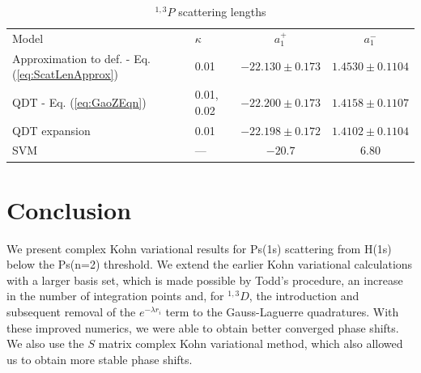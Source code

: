 \documentclass[preprint,showpacs,showkeys,preprintnumbers,amsmath,amssymb,longbibliography,pra,aps]{revtex4-1}
\begin{document}
\begin{table}[H]
\begin{center}
\begin{ruledtabular}
\begin{tabular}{l l c c}
Model & $\kappa$ & $a_1^+$ & $a_1^-$ \\
\colrule
Approximation to def. - Eq. (\ref{eq:ScatLenApprox}) & 0.01 & $-22.130 \pm 0.173$ & $1.4530 \pm 0.1104$ \\
QDT - Eq. (\ref{eq:GaoZEqn}) & 0.01, 0.02 & $-22.200 \pm 0.173$ & $1.4158 \pm 0.1107$ \\
QDT expansion \cite{Gao1998a} & 0.01 & $-22.198 \pm 0.172$ & $1.4102 \pm 0.1104$ \\
\colrule
SVM \cite{Ivanov2002} & --- & $-20.7$ & $6.80$ 
\end{tabular}
\end{ruledtabular}
\caption{$^{1,3}P$ scattering lengths}
\label{tab:PWaveScatLen}
\end{center}
\end{table}


\section{Conclusion}

We present complex Kohn variational results for Ps(1s) scattering from H(1s) 
below the Ps(n=2) threshold. We extend the earlier Kohn variational 
calculations \cite{VanReeth2003,VanReeth2004} with a larger basis set, which 
is made possible by Todd's procedure,
an increase in the number of integration points and, for
$^{1,3}D$, the introduction and subsequent removal of the $e^{-\lambda r_i}$
term to the Gauss-Laguerre quadratures. With these improved numerics, we were
able to obtain better converged phase shifts.
We also use the $S$ matrix complex Kohn variational method, which also allowed
us to obtain more stable phase shifts.

\end{document}
